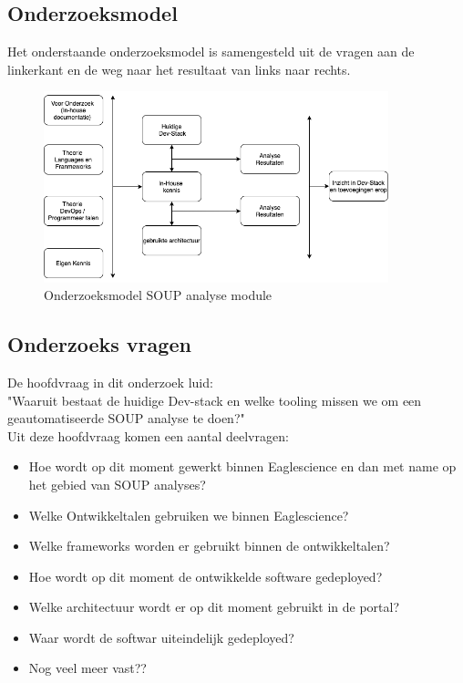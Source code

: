 \subsection{Onderzoeksmodel}
Het onderstaande onderzoeksmodel is samengesteld uit de vragen aan de linkerkant en de weg naar het resultaat van links naar rechts.\\
\begin{figure}[h!]
\myfloatalign
\includegraphics[width=10cm]{gfx/OnderzoeksmodelES}
\caption{Onderzoeksmodel SOUP analyse module}
\label{fig:Onderzoeks model Dev-Stack}
\end{figure}

\subsection{Onderzoeks vragen}
De hoofdvraag in dit onderzoek luid: \\
"Waaruit bestaat de huidige Dev-stack en welke tooling missen we om een geautomatiseerde SOUP analyse te doen?"\\
Uit deze hoofdvraag komen een aantal deelvragen:

\begin{itemize}
  \item Hoe wordt op dit moment gewerkt binnen Eaglescience en dan met name op het gebied van SOUP analyses?
  \item Welke Ontwikkeltalen gebruiken we binnen Eaglescience?
  \item Welke frameworks worden er gebruikt binnen de ontwikkeltalen?
  \item Hoe wordt op dit moment de ontwikkelde software gedeployed?
  \item Welke architectuur wordt er op dit moment gebruikt in de portal?
  \item Waar wordt de softwar uiteindelijk gedeployed?
  \item Nog veel meer vast??
\end{itemize}

